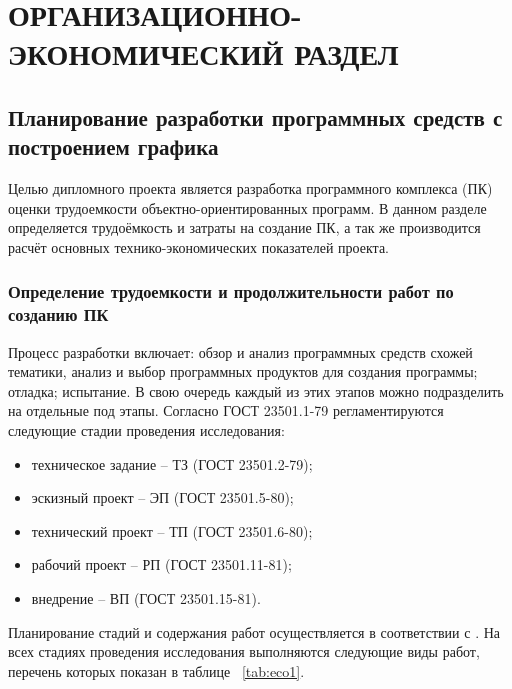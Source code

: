 \section{ОРГАНИЗАЦИОННО-ЭКОНОМИЧЕСКИЙ РАЗДЕЛ}
\subsection{Планирование разработки программных средств с построением графика}
Целью дипломного проекта является разработка программного комплекса (ПК) оценки трудоемкости объектно-ориентированных программ.
В данном разделе определяется трудоёмкость и затраты на создание ПК, а так же производится расчёт основных технико-экономических
показателей проекта.

\subsubsection*{Определение трудоемкости и продолжительности работ по созданию ПК}
Процесс разработки включает: обзор и анализ программных средств схожей тематики, анализ и выбор программных продуктов для
создания программы; отладка; испытание. В свою очередь каждый из этих этапов можно подразделить на отдельные под этапы.
Согласно ГОСТ 23501.1-79 регламентируются следующие стадии проведения исследования:

\begin{itemize}
	\item техническое задание – ТЗ (ГОСТ 23501.2-79);
	\item эскизный проект – ЭП (ГОСТ 23501.5-80);
	\item технический проект – ТП (ГОСТ 23501.6-80);
	\item рабочий проект – РП (ГОСТ 23501.11-81);
	\item внедрение – ВП (ГОСТ 23501.15-81).
\end{itemize}

Планирование стадий и содержания работ осуществляется в соответствии с \cite{bibl51}. На всех стадиях проведения исследования
выполняются следующие виды работ, перечень которых показан в таблице ~\ref{tab:eco1}.

